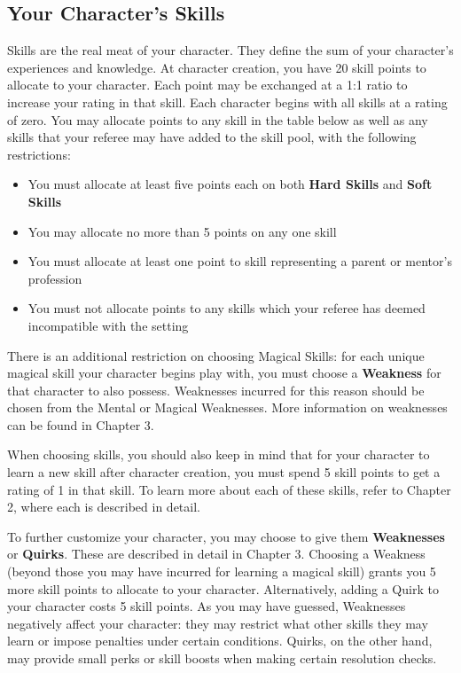 \documentclass[oneside]{book}
\begin{document}
\begin{multicols}{2}
\section{Your Character's Skills}
Skills are the real meat of your character. They define the sum of your character's experiences and knowledge. At character creation, you have 20 skill points to allocate to your character. Each point may be exchanged at a 1:1 ratio to increase your rating in that skill. Each character begins with all skills at a rating of zero. You may allocate points to any skill in the table below as well as any skills that your referee may have added to the skill pool, with the following restrictions:
	\begin{itemize}
		\item{ \small You must allocate at least five points each on both \textbf{Hard Skills} and \textbf{Soft Skills}}
		\item{ \small You may allocate no more than 5 points on any one skill}
		\item{ \small You must allocate at least one point to skill representing a parent or mentor's profession}
		\item{ \small You must not allocate points to any skills which your referee has deemed incompatible with the setting}
\end{itemize}	

There is an additional restriction on choosing Magical Skills: for each unique magical skill your character begins play with, you must choose a \textbf{Weakness} for that character to also possess. Weaknesses incurred for this reason should be chosen from the Mental or Magical Weaknesses. More information on weaknesses can be found in Chapter 3.

When choosing skills, you should also keep in mind that for your character to learn a new skill after character creation, you must spend 5 skill points to get a rating of 1 in that skill. To learn more about each of these skills, refer to Chapter 2, where each is described in detail.

To further customize your character, you may choose to give them \textbf{Weaknesses} or \textbf{Quirks}. These are described in detail in Chapter 3. Choosing a Weakness (beyond those you may have incurred for learning a magical skill) grants you 5 more skill points to allocate to your character. Alternatively, adding a Quirk to your character costs 5 skill points. As you may have guessed, Weaknesses negatively affect your character: they may restrict what other skills they may learn or impose penalties under certain conditions. Quirks, on the other hand, may provide small perks or skill boosts when making certain resolution checks.
\end{multicols}
\newpage
\end{document}
